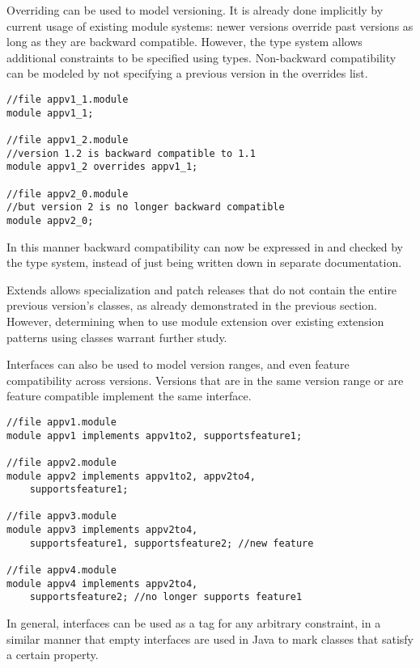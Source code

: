 
Overriding can be used to model versioning. It is already done
implicitly by current usage of existing module systems: newer versions  
override past versions as long as they are backward compatible.
However, the type system allows additional constraints to be specified using
types. Non-backward compatibility can be modeled by not specifying a
previous version in the overrides list.

\begin{lstlisting}[caption=Versioning Using Overrides]
//file appv1_1.module
module appv1_1;

//file appv1_2.module
//version 1.2 is backward compatible to 1.1
module appv1_2 overrides appv1_1;

//file appv2_0.module
//but version 2 is no longer backward compatible
module appv2_0; 
\end{lstlisting}

In this manner backward compatibility can now be expressed in 
and checked by the type system, instead of just being written
down in separate documentation.

Extends allows specialization and patch releases that do not contain 
the entire previous version's classes, as already demonstrated in
the previous section. However, determining when to use module
extension over existing extension patterns using classes warrant
further study.

Interfaces can also be used to model version ranges, and even feature
compatibility across versions. Versions that are in the same version 
range or are feature compatible implement the same interface.

\begin{lstlisting}[caption=Interfaces as Properties]
//file appv1.module
module appv1 implements appv1to2, supportsfeature1;

//file appv2.module
module appv2 implements appv1to2, appv2to4, 
	supportsfeature1;

//file appv3.module
module appv3 implements appv2to4, 
	supportsfeature1, supportsfeature2; //new feature

//file appv4.module
module appv4 implements appv2to4, 
	supportsfeature2; //no longer supports feature1
\end{lstlisting}

In general, interfaces can be used as a tag for any arbitrary constraint, 
in a similar manner that empty interfaces are used in Java to mark classes 
that satisfy a certain property.

